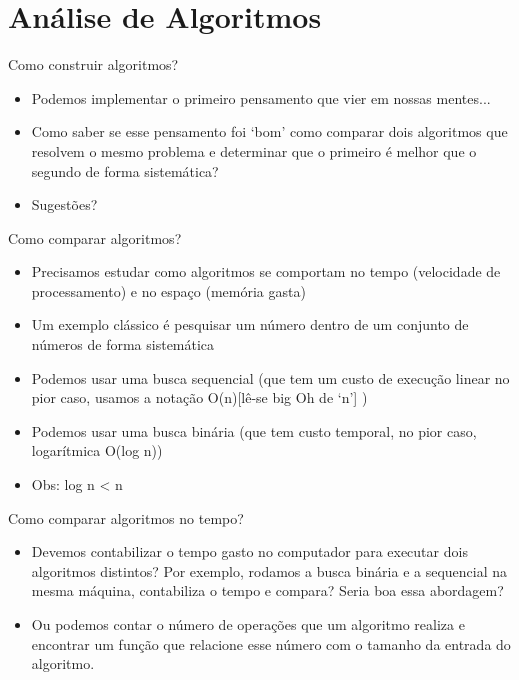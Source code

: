 \section*{Análise de Algoritmos}

\begin{frame}
\begin{block}{Como construir algoritmos?}
	\begin{itemize}
		\item Podemos implementar o primeiro pensamento que vier em nossas mentes...
		
		\item Como saber se esse pensamento foi ‘bom’ como comparar dois algoritmos que resolvem o mesmo problema e determinar que o primeiro é melhor que o segundo de forma sistemática?
		
		\item Sugestões?
	\end{itemize}
\end{block}
\end{frame}


\begin{frame}
\begin{block}{Como comparar algoritmos?}
	\begin{itemize}
		\item Precisamos estudar como algoritmos se comportam no tempo (velocidade de processamento) e no espaço (memória gasta)

		\item Um exemplo clássico é pesquisar um número dentro de um conjunto de números de forma sistemática
		
		\item Podemos usar uma busca sequencial (que tem um custo de execução linear no pior caso, usamos a notação O(n)[lê-se big Oh de ‘n’] )
		
		\item Podemos usar uma busca binária (que tem custo temporal, no pior caso, logarítmica O(log n))
		
		\item Obs: log n < n
	\end{itemize}
\end{block}
\end{frame}

\begin{frame}
\begin{block}{Como comparar algoritmos no tempo?}
	\begin{itemize}
		\item Devemos contabilizar o tempo gasto no computador para executar dois algoritmos distintos? Por exemplo, rodamos a busca binária e a sequencial na mesma máquina, contabiliza o tempo e compara? Seria boa essa abordagem?

		\item Ou podemos contar o número de operações que um algoritmo realiza e encontrar um função que relacione esse número com o tamanho da entrada do algoritmo.
		
	\end{itemize}
\end{block}
\end{frame}


